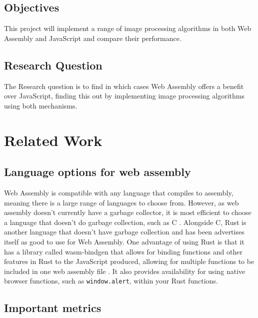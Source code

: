 \documentclass[12pt,a4paper]{article}
\begin{document}
\subsection{Objectives}

This project will implement a range of image processing algorithms in both Web Assembly and JavaScript and compare their performance.


\subsection{Research Question}

The Research question is to find in which cases Web Assembly offers a benefit over JavaScript, finding this out by implementing image processing algorithms using both mechanisms.

\newpage


\section{Related Work}

\subsection{Language options for web assembly}
\color{Mulberry}

Web Assembly is compatible with any language that compiles to assembly, meaning there is a large range of languages to choose from. However, as web assembly doesn't currently have a garbage collector, it is most efficient to choose a language that doesn't do garbage collection, such as C \cite{haas2017bringing}. Alongside C, Rust is another language that doesn't have garbage collection and has been advertises itself as good to use for Web Assembly. One advantage of using Rust is that it has a library called wasm-bindgen that allows for binding functions and other features in Rust to the JavaScript produced, allowing for multiple functions to be included in one web assembly file \cite{wasmbindgen}. It also provides availability for using native browser functions, such as \texttt{window.alert}, within your Rust functions.

\color{black}


\subsection{Important metrics}
\color{Mulberry}
\end{document}
